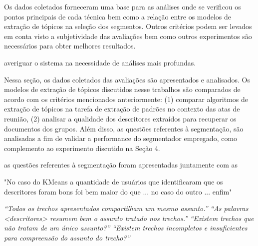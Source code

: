 






Os dados coletados forneceram uma base para as análises onde se verificou os pontos principais de cada técnica bem como a relação entre os modelos de extração de tópicos na seleção dos segmentos. Outros critérios podem ser levados em conta visto a subjetividade das avaliações bem como outros experimentos são necessários para obter melhores resultados.

averiguar o sistema na necessidade de análises mais profundas.































Nessa seção, os dados coletados das avaliações são apresentados e analisados. Os
modelos de extração de tópicos discutidos nesse trabalhos são comparados de acordo com
os critérios mencionados anteriormente: (1) comparar algoritmos de extração de tópicos na
tarefa de extração de padrões no contexto das atas de reunião, (2) analisar a qualidade dos
descritores extraídos para recuperar os documentos dos grupos. Além disso, as questões
referentes à segmentação, são analisadas a fim de validar a performance do segmentador
empregado, como complemento ao experimento discutido na Seção 4.











as questões referentes à segmentação foram apresentadas juntamente com as 





"No caso do KMeans a quantidade de usuários que identificaram que os descritores foram bons foi bem maior do que ... no caso do outro ... enfim" 


\textit{``Todos os trechos apresentados compartilham um mesmo assunto.''}
\textit{``As palavras \textit{<descritores>} resumem bem o assunto tratado nos trechos.''}
\textit{``Existem trechos que não tratam de um único assunto?''}
\textit{``Existem trechos incompletos e insuficientes para compreensão do assunto do trecho?''}







